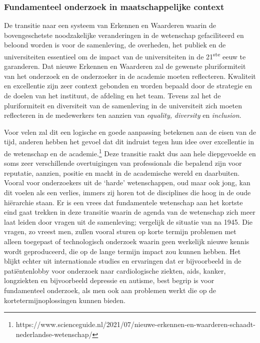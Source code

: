 \documentclass[smallauthor, chapterhaspagenum, nochapterinheader, pagenuminheader,  bigchapnum,medium2, tocpages,  garamond, titleinheader]{jote-book}
\begin{document}
	\subsubsection{Fundamenteel onderzoek in maatschappelijke context}



	De transitie naar een systeem van Erkennen en Waarderen waarin de bovengeschetste noodzakelijke veranderingen in de wetenschap gefaciliteerd en beloond worden is voor de samenleving, de overheden, het publiek en de universiteiten essentieel om de impact van de universiteiten in de 21\textsuperscript{ste} eeuw te garanderen. Dat nieuwe Erkennen en Waarderen zal de gewenste pluriformiteit van het onderzoek en de onderzoeker in de academie moeten reflecteren. Kwaliteit en excellentie zijn zeer context gebonden en worden bepaald door de strategie en de doelen van het instituut, de afdeling en het team. Tevens zal het de pluriformiteit en diversiteit van de samenleving in de universiteit zich moeten reflecteren in de medewerkers ten aanzien van \emph{equality}\emph{, }\emph{diversity}\emph{ }en\emph{ }\emph{inclusion}.



	Voor velen zal dit een logische en goede aanpassing betekenen aan de eisen van de tijd, anderen hebben het gevoel dat dit indruist tegen hun idee over excellentie in de wetenschap en de academie.\footnote{https://www.scienceguide.nl/2021/07/nieuwe-erkennen-en-waarderen-schaadt-nederlandse-wetenschap/} Deze transitie raakt dus aan hele diepgevoelde en soms zeer verschillende overtuigingen van professionals die bepalend zijn voor reputatie, aanzien, positie en macht in de academische wereld en daarbuiten. Vooral voor onderzoekers uit de ‘harde' wetenschappen, oud maar ook jong, kan dit voelen als een verlies, immers zij horen tot de disciplines die hoog in de oude hiërarchie staan. Er is een vrees dat fundamentele wetenschap aan het kortste eind gaat trekken in deze transitie waarin de agenda van de wetenschap zich meer laat leiden door vragen uit de samenleving; vergelijk de situatie van na 1945. Die vragen, zo vreest men, zullen vooral sturen op korte termijn problemen met alleen toegepast of technologisch onderzoek waarin geen werkelijk nieuwe kennis wordt geproduceerd, die op de lange termijn impact zou kunnen hebben. Het blijkt echter uit internationale studies en ervaringen dat er bijvoorbeeld in de patiëntenlobby voor onderzoek naar cardiologische ziekten, aids, kanker, longziekten en bijvoorbeeld depressie en autisme, best begrip is voor fundamenteel onderzoek, als men ook aan problemen werkt die op de kortetermijnoplossingen kunnen bieden.
\end{document}
